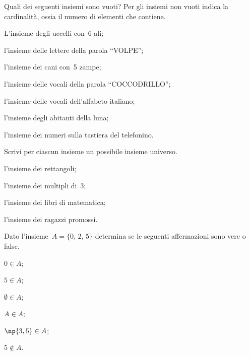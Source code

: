 \begin{esercizio}
\label{ese:5.12}
Quali dei seguenti insiemi sono vuoti? Per gli insiemi non vuoti indica la cardinalità, ossia il numero di elementi che contiene.
\begin{enumeratea}
\item L'insieme degli uccelli con~6 ali;
\item l'insieme delle lettere della parola ``VOLPE'';
\item l'insieme dei cani con~5 zampe;
\item l'insieme delle vocali della parola ``COCCODRILLO'';
\item l'insieme delle vocali dell'alfabeto italiano;
\item l'insieme degli abitanti della luna;
\item l'insieme dei numeri sulla tastiera del telefonino.
\end{enumeratea}
\end{esercizio}
\pagebreak
\begin{esercizio}
\label{ese:5.13}
Scrivi per ciascun insieme un possibile insieme universo.
\begin{multicols}{2}
\begin{enumeratea}
\item l'insieme dei rettangoli;
\item l'insieme dei multipli di~3;
\item l'insieme dei libri di matematica;
\item l'insieme dei ragazzi promossi.%
\end{enumeratea}
\end{multicols}
\end{esercizio}

\begin{esercizio}[\Ast]
\label{ese:5.14}
Dato l'insieme~$A = \{\text{0, 2, 5}\}$ determina se le seguenti affermazioni sono vere o false.
\begin{multicols}{3}
\begin{enumeratea}
\item $0\in A$; %
\item $5\in A$; %
\item $\emptyset \in A$; %
\item $A\in A$; %
\item $\np{3,5}\in A$; %
\item $5\notin A$. %
\end{enumeratea}
\end{multicols}
\end{esercizio}

